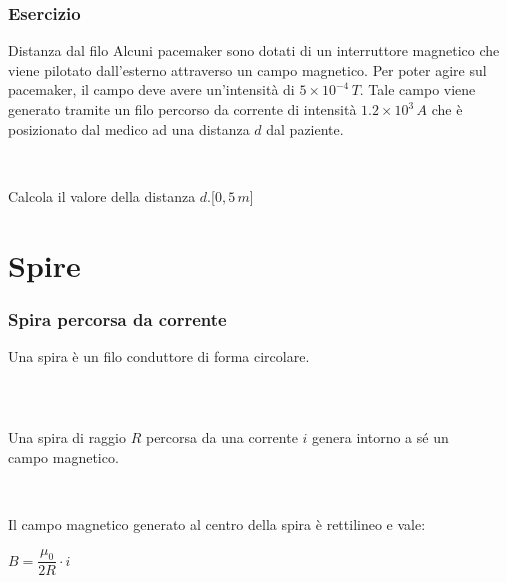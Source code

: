 \documentclass[]{beamer}
\theoremstyle{plain}
\begin{document}
\begin{frame}
\frametitle{Esercizio}
\begin{exampleblock}{Distanza dal filo}
  Alcuni pacemaker sono dotati di un interruttore magnetico che viene pilotato dall'esterno attraverso un campo magnetico. Per poter agire sul pacemaker, il campo deve avere un'intensità di $ 5 \times 10^{-4} \, T $. Tale campo viene generato tramite un filo percorso da corrente di intensità $ 1.2 \times 10^{3} \, A $ che è posizionato dal medico ad una distanza $ d $ dal paziente.

  ~

  Calcola il valore della distanza $ d $.\hspace{\fill}[$ 0,5 \, m $]
\end{exampleblock} 
\end{frame}


\section{Spire}



\begin{frame}
\frametitle{Spira percorsa da corrente}
Una spira è un filo conduttore di forma circolare.\pause

~


\begin{columns}
\begin{column}{0.5\textwidth}
Una spira di raggio $ R $ percorsa da una corrente $ i $ genera intorno a sé un campo magnetico.\pause

~

Il campo magnetico generato al centro della spira è rettilineo e vale:
\begin{center}
\colorbox{blue!30}{$ B = \dfrac{\mu_0}{2R} \cdot i $}
\end{center}
\end{column}
\begin{column}{0.4\textwidth}
\end{column}
\end{columns}
\end{frame}
\end{document}

